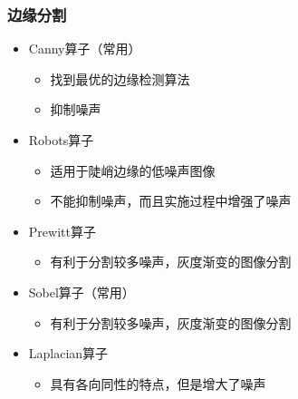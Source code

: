\documentclass[notheorems,mathserif,table,compress]{beamer}  %
\begin{document}
\begin{frame}
  \frametitle{边缘分割}
        \begin{itemize}
        \item Canny算子（常用）
            \begin{itemize}
            \item 找到最优的边缘检测算法
            \item 抑制噪声
            \end{itemize}
        \item Robots算子 %
            \begin{itemize}
            \item 适用于陡峭边缘的低噪声图像
            \item 不能抑制噪声，而且实施过程中增强了噪声
            \end{itemize}
        \item Prewitt算子 %
           \begin{itemize}
           \item 有利于分割较多噪声，灰度渐变的图像分割
           \end{itemize}
        \item Sobel算子（常用） %
            \begin{itemize}
            \item 有利于分割较多噪声，灰度渐变的图像分割
            \end{itemize}
        \item Laplacian算子 %
            \begin{itemize}
            \item 具有各向同性的特点，但是增大了噪声
            \end{itemize}
        \end{itemize}
\end{frame}
\end{document}
